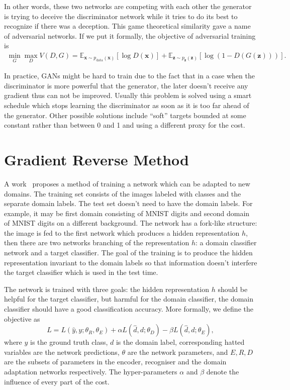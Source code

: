 \documentclass{article}
\begin{document}
    In other words, these two networks are competing with each other the 
    generator is trying to deceive the discriminator network while it tries
    to do its best to recognize if there was a deception. This game theoretical
    similarity gave a name of adversarial networks. If we put it formally, the 
    objective of adversarial training is
    \begin{align*}
        \min_G \max_D V(D, G) = \mathbb{E}_{\bm{x} \sim p_{\text{data}}(\bm{x})}[\log D(\bm{x})] + 
            \mathbb{E}_{\bm{z} \sim p_{\bm{z}}(\bm{z})}[\log (1 - D(G(\bm{z})))].
    \end{align*}

    In practice, GANs might be hard to train due to the fact that in a case when 
    the discriminator is more powerful that the generator, the later doesn't 
    receive any gradient thus can not be improved. Usually this problem is solved
    using a smart schedule which stops learning the discriminator as soon as it
    is too far ahead of the generator. Other possible solutions include ``soft''
    targets bounded at some constant rather than between 0 and 1 and using a 
    different proxy for the cost.

\section{Gradient Reverse Method}
\label{sec:gradient-reverse}

    A work~\cite{ganin2014unsupervised} proposes a method of training a network 
    which can be adapted to new domains. The training set consists of the images
    labeled with classes and the separate domain labels. The test set doesn't need
    to have the domain labels. For example, it may be first domain
    consisting of MNIST digits and second domain of MNIST digits on a different
    background. The network has a fork-like structure: the image is fed to the
    first network which produces a hidden representation $h$, then there are two
    networks branching of the representation $h$: a domain classifier network and 
    a target classifier. The goal of the training is to produce the hidden 
    representation invariant to the domain labels so that information doesn't 
    interfere the target classifier which is used in the test time.

    The network is trained with three goals: the hidden representation $h$ should
    be helpful for the target classifier, but harmful for the domain classifier,
    the domain classifier should have a good classification accuracy. More 
    formally, we define the objective as
    \begin{equation}
        L = L(\hat{y}, y; \theta_R, \theta_E) + 
        \alpha L(\hat{d}, d; \theta_D) -
        \beta L(\hat{d}, d; \theta_E),
    \end{equation}
    where $y$ is the ground truth class, $d$ is the domain label, corresponding
    hatted variables are the network predictions, $\theta$ are the network 
    parameters, and $E, R, D$ are the subsets of parameters in the encoder,
    recogniser and the domain adaptation networks respectively. The hyper-parameters
    $\alpha$ and $\beta$ denote the influence of every part of the cost.
\end{document}
